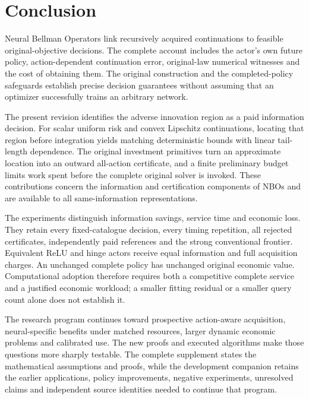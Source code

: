 \section{Conclusion}\label{sec:conclusion119}
Neural Bellman Operators link recursively acquired continuations to feasible
original-objective decisions. The complete account includes the actor's own
future policy, action-dependent continuation error, original-law numerical
witnesses and the cost of obtaining them. The original construction and the
completed-policy safeguards establish precise decision guarantees without
assuming that an optimizer successfully trains an arbitrary network.

The present revision identifies the adverse innovation region as a paid
information decision. For scalar uniform risk and convex Lipschitz
continuations, locating that region before integration yields matching
deterministic bounds with linear tail-length dependence. The original
investment primitives turn an approximate location into an outward
all-action certificate, and a finite preliminary budget limits work spent
before the complete original solver is invoked. These contributions concern
the information and certification components of NBOs and are available to
all same-information representations.

The experiments distinguish information savings, service time and economic
loss. They retain every fixed-catalogue decision, every timing repetition,
all rejected certificates, independently paid references and the strong
conventional frontier. Equivalent ReLU and hinge actors receive equal
information and full acquisition charges. An unchanged complete policy has
unchanged original economic value. Computational adoption therefore requires
both a competitive complete service and a justified economic workload; a
smaller fitting residual or a smaller query count alone does not establish it.

The research program continues toward prospective action-aware acquisition,
neural-specific benefits under matched resources, larger dynamic economic
problems and calibrated use. The new proofs and executed algorithms make
those questions more sharply testable. The complete supplement states the
mathematical assumptions and proofs, while the development companion retains
the earlier applications, policy improvements, negative experiments, unresolved
claims and independent source identities needed to continue that program.
